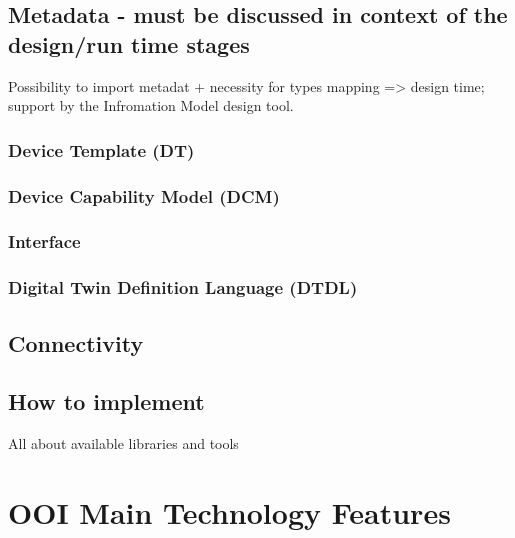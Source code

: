 \documentclass[
]{article}
\begin{document}
\hypertarget{metadata---must-be-discussed-in-context-of-the-designrun-time-stages}{%
\subsection{Metadata - must be discussed in context of the design/run
time
stages}\label{metadata---must-be-discussed-in-context-of-the-designrun-time-stages}}

Possibility to import metadat + necessity for types mapping
=\textgreater{} design time; support by the Infromation Model design
tool.

\hypertarget{device-template-dt}{%
\subsubsection{Device Template (DT)}\label{device-template-dt}}

\hypertarget{device-capability-model-dcm}{%
\subsubsection{Device Capability Model
(DCM)}\label{device-capability-model-dcm}}

\hypertarget{interface}{%
\subsubsection{Interface}\label{interface}}

\hypertarget{digital-twin-definition-language-dtdl}{%
\subsubsection{Digital Twin Definition Language
(DTDL)}\label{digital-twin-definition-language-dtdl}}

\hypertarget{connectivity}{%
\subsection{Connectivity}\label{connectivity}}

\hypertarget{how-to-implement}{%
\subsection{How to implement}\label{how-to-implement}}

All about available libraries and tools

\hypertarget{ooi-main-technology-features}{%
\section{OOI Main Technology
Features}\label{ooi-main-technology-features}}
\end{document}
